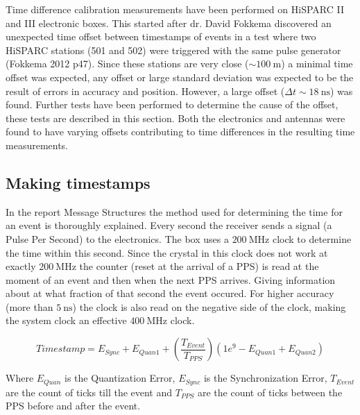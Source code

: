 Time difference calibration measurements have been performed on
HiSPARC II and III electronic boxes. This started after dr. David
Fokkema discovered an unexpected time offset between timestamps of
events in a test where two HiSPARC stations (501 and 502) were triggered
with the same pulse generator (Fokkema 2012 p47). Since these stations
are very close ($\sim\SI{100}{\meter}$) a minimal time offset was
expected, any offset or large standard deviation was expected to be the
result of errors in \gps accuracy and position. However, a large offset
($\Delta t \sim\SI{18}{\nano\second}$) was found. Further tests have
been performed to determine the cause of the offset, these tests are
described in this section. Both the \hisparc electronics and \gps
antennas were found to have varying offsets contributing to time
differences in the resulting time measurements.


\subsection{Making timestamps}
\label{sub:gps_timestamps}

In the report Message Structures \hisparc the method used for
determining the time for an event is thoroughly explained. Every second
the \gps receiver sends a signal (a Pulse Per Second) to the \hisparc
electronics. The \hisparc box uses a $\SI{200}{\mega\hertz}$ clock to
determine the time within this second. Since the crystal in this clock
does not work at exactly $\SI{200}{\mega\hertz}$ the counter (reset at
the arrival of a PPS) is read at the moment of an event and then when
the next PPS arrives. Giving information about at what fraction of that
second the event occured. For higher accuracy (more than
$\SI{5}{\nano\second}$) the clock is also read on the negative side of
the clock, making the system clock an effective
$\SI{400}{\mega\hertz}$ clock.

\begin{equation}
    Timestamp = E_{Sync} + E_{Quan1} + \left(\frac{T_{Event}}{T_{PPS}}\right)
                 \left(1e^9 - E_{Quan1} + E_{Quan2}\right)
\end{equation}

Where $E_{Quan}$ is the Quantization Error, $E_{Sync}$ is the
Synchronization Error, $T_{Event}$ are the count of ticks till the event
and $T_{PPS}$ are the count of ticks between the PPS before and after
the event.



